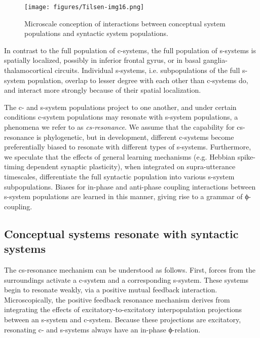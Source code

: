   
\begin{figure}
\texttt{[image: figures/Tilsen-img16.png]}
\caption{Microscale conception of interactions between conceptual system populations and syntactic system populations.}
\label{fig:2:9}
\end{figure}
 

  In contrast to the full population of c-systems, the full population of s-systems is spatially localized, possibly in inferior frontal gyrus, or in basal ganglia-thalamocortical circuits. Individual s-systems, i.e. subpopulations of the full s-system population, overlap to lesser degree with each other than c-systems do, and interact more strongly because of their spatial localization. 

  The c- and s-system populations project to one another, and under certain conditions c-system populations may resonate with s-system populations, a phenomena we refer to as \textit{cs-resonance}. We assume that the capability for cs-resonance is phylogenetic, but in development, different c-systems become preferentially biased to resonate with different types of s-systems. Furthermore, we speculate that the effects of general learning mechanisms (e.g. Hebbian spike-timing dependent synaptic plasticity), when integrated on supra-utterance timescales, differentiate the full syntactic population into various s-system subpopulations. Biases for in-phase and anti-phase coupling interactions between s-system populations are learned in this manner, giving rise to a grammar of ϕ-coupling.

\subsection{Conceptual systems resonate with syntactic systems}

The cs-resonance mechanism can be understood as follows. First, forces from the surroundings activate a c-system and a corresponding s-system. These systems begin to resonate weakly, via a positive mutual feedback interaction. Microscopically, the positive feedback resonance mechanism derives from integrating the effects of excitatory-to-excitatory interpopulation projections between an s-system and c-system. Because these projections are excitatory, resonating c- and s-systems always have an in-phase ϕ-relation. 

